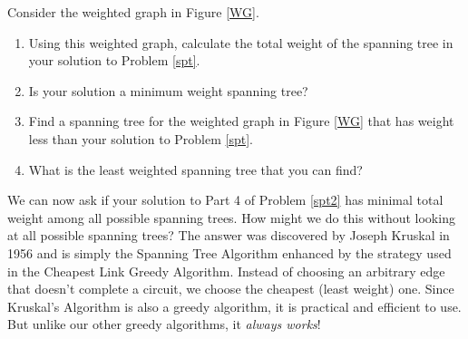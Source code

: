 \begin{prb}
\label{spt2}
Consider the weighted graph in Figure \ref{WG}.
\begin{enumerate}
\item Using this weighted graph, calculate the total weight of the spanning tree in your solution to Problem \ref{spt}.
\item Is your solution a minimum weight spanning tree?
\item Find a spanning tree for the weighted graph in Figure \ref{WG} that has weight less than your solution to Problem \ref{spt}.
\item What is the least weighted spanning tree that you can find?
\begin{annotation}
\end{annotation}
\end{enumerate}
\end{prb}

We can now ask if your solution to Part 4 of Problem \ref{spt2} has minimal total weight among all possible spanning trees.  How might we do this without looking at all possible spanning trees?  The answer was discovered by Joseph Kruskal in 1956 and is simply the Spanning Tree Algorithm enhanced by the strategy used in the Cheapest Link Greedy Algorithm. Instead of choosing an arbitrary edge that doesn't complete a circuit, we choose the cheapest (least weight) one. Since Kruskal's Algorithm is also a greedy algorithm, it is practical and efficient to use.  But unlike our other greedy algorithms, it \emph{always works\/}!  \msk

